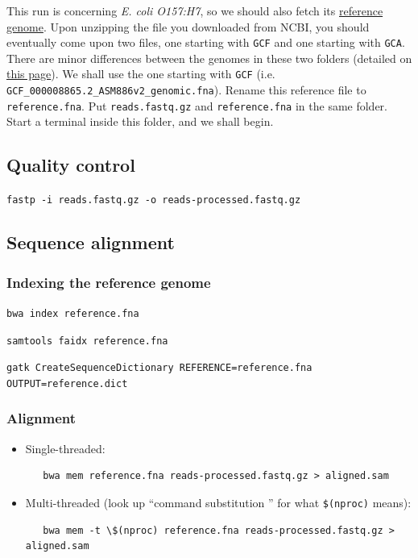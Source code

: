 \documentclass[12pt,letterpaper]{article}
\begin{document}
This run is concerning \textit{E. coli O157:H7}, so we should also fetch its \href{https://www.ncbi.nlm.nih.gov/datasets/taxonomy/83334/}{reference genome}. Upon unzipping the file you downloaded from NCBI, you should eventually come upon two files, one starting with \texttt{GCF} and one starting with \texttt{GCA}. There are minor differences between the genomes in these two folders (detailed on \href{https://www.ncbi.nlm.nih.gov/assembly/model/}{this page}). We shall use the one starting with \texttt{GCF} (i.e. \texttt{GCF\_000008865.2\_ASM886v2\_genomic.fna}). Rename this reference file to \texttt{reference.fna}. Put \texttt{reads.fastq.gz} and \texttt{reference.fna} in the same folder. Start a terminal inside this folder, and we shall begin.

\subsection{Quality control}

\texttt{fastp -i reads.fastq.gz -o reads-processed.fastq.gz}

\subsection{Sequence alignment}

\subsubsection{Indexing the reference genome}

\texttt{bwa index reference.fna}

\texttt{samtools faidx reference.fna}

\texttt{gatk CreateSequenceDictionary REFERENCE=reference.fna OUTPUT=reference.dict}

\subsubsection{Alignment}

\begin{itemize}
   \item Single-threaded:
   \begin{verbatim}
   bwa mem reference.fna reads-processed.fastq.gz > aligned.sam
   \end{verbatim}
   \item Multi-threaded (look up ``command substitution '' for what \texttt{\$(nproc)} means):
   \begin{verbatim}
   bwa mem -t \$(nproc) reference.fna reads-processed.fastq.gz > aligned.sam
   \end{verbatim}
\end{itemize}
\end{document}
